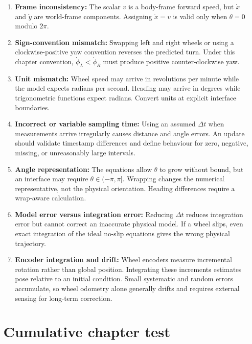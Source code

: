\documentclass[
  australian,
  12pt,
  letterpaper,
  DIV=11,
  numbers=noendperiod,
  twoside]{scrreprt}
\begin{document}
\begin{enumerate}
\def\labelenumi{\arabic{enumi}.}
\item
  \textbf{Frame inconsistency:} The scalar \(v\) is a body-frame forward
  speed, but \(\dot x\) and \(\dot y\) are world-frame components.
  Assigning \(\dot x=v\) is valid only when \(\theta=0\) modulo
  \(2\pi\).
\item
  \textbf{Sign-convention mismatch:} Swapping left and right wheels or
  using a clockwise-positive yaw convention reverses the predicted turn.
  Under this chapter convention, \(\dot\phi_L<\dot\phi_R\) must produce
  positive counter-clockwise yaw.
\item
  \textbf{Unit mismatch:} Wheel speed may arrive in revolutions per
  minute while the model expects radians per second. Heading may arrive
  in degrees while trigonometric functions expect radians. Convert units
  at explicit interface boundaries.
\item
  \textbf{Incorrect or variable sampling time:} Using an assumed
  \(\Delta t\) when measurements arrive irregularly causes distance and
  angle errors. An update should validate timestamp differences and
  define behaviour for zero, negative, missing, or unreasonably large
  intervals.
\item
  \textbf{Angle representation:} The equations allow \(\theta\) to grow
  without bound, but an interface may require \(\theta\in(-\pi,\pi]\).
  Wrapping changes the numerical representative, not the physical
  orientation. Heading differences require a wrap-aware calculation.
\item
  \textbf{Model error versus integration error:} Reducing \(\Delta t\)
  reduces integration error but cannot correct an inaccurate physical
  model. If a wheel slips, even exact integration of the ideal no-slip
  equations gives the wrong physical trajectory.
\item
  \textbf{Encoder integration and drift:} Wheel encoders measure
  incremental rotation rather than global position. Integrating these
  increments estimates pose relative to an initial condition. Small
  systematic and random errors accumulate, so wheel odometry alone
  generally drifts and requires external sensing for long-term
  correction.
\end{enumerate}

\section*{Cumulative chapter test}\label{cumulative-chapter-test-1}
\end{document}
